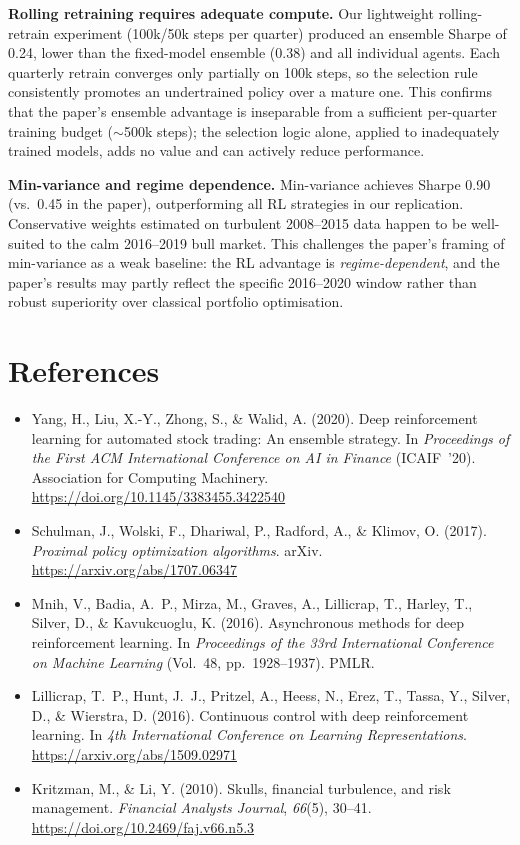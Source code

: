\documentclass[11pt,a4paper]{article}
\begin{document}
\textbf{Rolling retraining requires adequate compute.}
Our lightweight rolling-retrain experiment (100k/50k steps per quarter)
produced an ensemble Sharpe of 0.24, lower than the fixed-model ensemble
(0.38) and all individual agents.
Each quarterly retrain converges only partially on 100k steps, so the
selection rule consistently promotes an undertrained policy over a mature
one. This confirms that the paper's ensemble advantage is inseparable from
a sufficient per-quarter training budget ($\sim$500k steps); the selection
logic alone, applied to inadequately trained models, adds no value and can
actively reduce performance.

\textbf{Min-variance and regime dependence.}
Min-variance achieves Sharpe 0.90 (vs.\ 0.45 in the paper), outperforming
all RL strategies in our replication.
Conservative weights estimated on turbulent 2008--2015 data happen to be
well-suited to the calm 2016--2019 bull market.
This challenges the paper's framing of min-variance as a weak baseline:
the RL advantage is \emph{regime-dependent}, and the paper's results may
partly reflect the specific 2016--2020 window rather than robust superiority
over classical portfolio optimisation.

\newpage
\section*{References}
\begin{itemize}
  \item Yang, H., Liu, X.-Y., Zhong, S., \& Walid, A. (2020). Deep reinforcement
        learning for automated stock trading: An ensemble strategy. In
        \textit{Proceedings of the First ACM International Conference on AI in Finance}
        (ICAIF~'20). Association for Computing Machinery.
        \url{https://doi.org/10.1145/3383455.3422540}
  \item Schulman, J., Wolski, F., Dhariwal, P., Radford, A., \& Klimov, O. (2017).
        \textit{Proximal policy optimization algorithms}. arXiv.
        \url{https://arxiv.org/abs/1707.06347}
  \item Mnih, V., Badia, A.~P., Mirza, M., Graves, A., Lillicrap, T., Harley, T.,
        Silver, D., \& Kavukcuoglu, K. (2016). Asynchronous methods for deep
        reinforcement learning. In \textit{Proceedings of the 33rd International
        Conference on Machine Learning} (Vol.~48, pp.~1928--1937). PMLR.
  \item Lillicrap, T.~P., Hunt, J.~J., Pritzel, A., Heess, N., Erez, T., Tassa, Y.,
        Silver, D., \& Wierstra, D. (2016). Continuous control with deep reinforcement
        learning. In \textit{4th International Conference on Learning Representations}.
        \url{https://arxiv.org/abs/1509.02971}
  \item Kritzman, M., \& Li, Y. (2010). Skulls, financial turbulence, and risk
        management. \textit{Financial Analysts Journal}, \textit{66}(5), 30--41.
        \url{https://doi.org/10.2469/faj.v66.n5.3}
\end{itemize}
\end{document}
